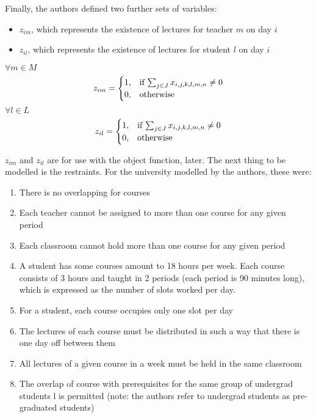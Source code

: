 Finally, the authors defined two further sets of variables:
\begin{itemize}
	\item \( z_{im} \), which represents the existence of lectures for teacher 
		\( m \) on day \( i \)
	\item \( z_{il} \), which represents the existence of lectures for student 
		\( l \) on day \( i \)
\end{itemize}
\begin{math}
	\forall m \in M
\end{math}
\begin{align*}
	z_{im} =
	\begin{cases}
		1, & \text{if \( \sum_{j \in J} x_{i,j,k,l,m,n} \neq 0 \)} \\
		0, & \text{otherwise}
	\end{cases}	
\end{align*}
\begin{math}
	\forall l \in L
\end{math}
\begin{align*}
	z_{il} =
	\begin{cases}
		1, & \text{if \( \sum_{j \in J} x_{i,j,k,l,m,n} \neq 0 \)} \\
		0, & \text{otherwise}
	\end{cases}	
\end{align*}

\( z_{im} \) and \( z_{il} \) are for use with the object function, later. The
next thing to be modelled is the restraints.
For the university modelled by the authors, these were:

\begin{enumerate}
	\item There is no overlapping for courses
	\item Each teacher cannot be assigned to more than one course for any given
		period
	\item Each classroom cannot hold more than one course for any given period
	\item A student has some courses amount to 18 hours per week. Each course
		consists of 3 hours and taught in 2 periods (each period is 90 minutes
		long), which is expressed as the number of slots worked per day.
	\item For a student, each course occupies only one slot per day
	\item The lectures of each course must be distributed in such a way that
		there is one day off between them
	\item All lectures of a given course in a week must be held in the same
		classroom
	\item The overlap of course with prerequisites for the same group of
		undergrad students l is permitted (note: the authors refer to undergrad 
		students as pre-graduated students)
\end{enumerate}

